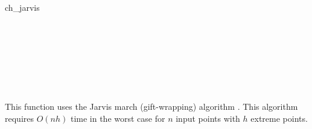 \begin{ccRefFunction}{ch_jarvis}
\ccSeeAlso

 \\
 \\
 \\
 \\
 \\
 \\


\ccImplementation
This function uses the Jarvis march (gift-wrapping)
algorithm \cite{j-ichfs-73}. This algorithm requires $O(n h)$ time 
in the worst case for $n$ input points with $h$ extreme points.  

\end{ccRefFunction}



